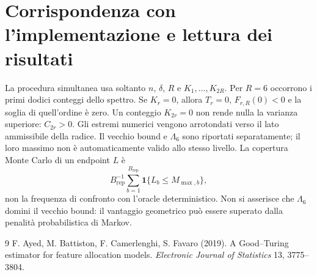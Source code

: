 \documentclass[11pt,a4paper]{article}
\theoremstyle{remark}\newtheorem{remark}[proposition]{Osservazione}
\newcommand{\ind}{\mathbf1}
\begin{document}
\section{Corrispondenza con l'implementazione e lettura dei risultati}
La procedura simultanea usa soltanto $n$, $\delta$, $R$ e
$K_1,\ldots,K_{2R}$. Per $R=6$ occorrono i primi dodici conteggi dello
spettro. Se $K_r=0$, allora $T_r=0$, $F_{r,R}(0)<0$ e la soglia
di quell'ordine è zero. Un conteggio $K_{2r}=0$ non rende nulla la
varianza superiore: $C_{2r}>0$.
Gli estremi numerici vengono arrotondati verso il lato ammissibile
della radice. Il vecchio bound e $\Lambda_6$ sono riportati separatamente;
il loro massimo non è automaticamente valido allo stesso livello.
La copertura Monte Carlo di un endpoint $L$ è
\[
 B_{\mathrm{rep}}^{-1}\sum_{b=1}^{B_{\mathrm{rep}}}
 \ind\{L_b\le M_{\max,b}\},
\]
non la frequenza di confronto con l'oracle deterministico.
Non si asserisce che $\Lambda_6$ domini il vecchio bound: il vantaggio
geometrico può essere superato dalla penalità probabilistica di Markov.

\begin{thebibliography}{9}
 F. Ayed, M. Battiston, F. Camerlenghi, S. Favaro (2019).
A Good--Turing estimator for feature allocation models.
\emph{Electronic Journal of Statistics} 13, 3775--3804.
\end{thebibliography}
\end{document}
